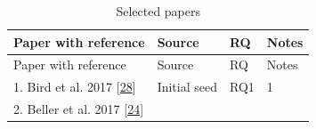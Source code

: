 \documentclass[]{book}
\begin{document}
\begin{longtable}[]{@{}llll@{}}
\caption{\label{tab:build-analytics-selected-papers} Selected
papers}\tabularnewline
\toprule
\begin{minipage}[b]{0.48\columnwidth}\raggedright\strut
Paper with reference\strut
\end{minipage} & \begin{minipage}[b]{0.20\columnwidth}\raggedright\strut
Source\strut
\end{minipage} & \begin{minipage}[b]{0.14\columnwidth}\raggedright\strut
RQ\strut
\end{minipage} & \begin{minipage}[b]{0.06\columnwidth}\raggedright\strut
Notes\strut
\end{minipage}\tabularnewline
\midrule
\endfirsthead
\toprule
\begin{minipage}[b]{0.48\columnwidth}\raggedright\strut
Paper with reference\strut
\end{minipage} & \begin{minipage}[b]{0.20\columnwidth}\raggedright\strut
Source\strut
\end{minipage} & \begin{minipage}[b]{0.14\columnwidth}\raggedright\strut
RQ\strut
\end{minipage} & \begin{minipage}[b]{0.06\columnwidth}\raggedright\strut
Notes\strut
\end{minipage}\tabularnewline
\midrule
\endhead
\begin{minipage}[t]{0.48\columnwidth}\raggedright\strut
1. Bird et al. 2017
{[}\protect\hyperlink{ref-bird2017predicting}{28}{]}\strut
\end{minipage} & \begin{minipage}[t]{0.20\columnwidth}\raggedright\strut
Initial seed\strut
\end{minipage} & \begin{minipage}[t]{0.14\columnwidth}\raggedright\strut
RQ1\strut
\end{minipage} & \begin{minipage}[t]{0.06\columnwidth}\raggedright\strut
1\strut
\end{minipage}\tabularnewline
\begin{minipage}[t]{0.48\columnwidth}\raggedright\strut
2. Beller et al. 2017
{[}\protect\hyperlink{ref-beller2017oops}{24}{]}\strut
\end{minipage} & \begin{minipage}[t]{0.20\columnwidth}\raggedright\strut

\end{minipage}
\end{longtable}
\end{document}
